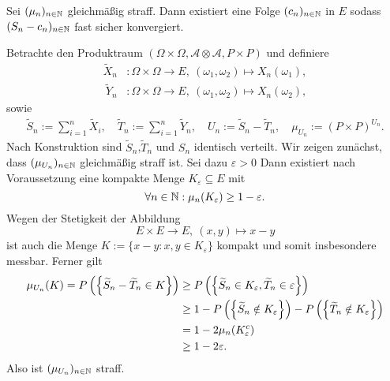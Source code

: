 \begin{theorem}
    Sei $(\mu_n)_{n \in \mathbb{N}}$ gleichmäßig straff. Dann existiert eine Folge $(c_n)_{n \in \mathbb{N}}$ in $E$ sodass $(S_n - c_n)_{n \in \mathbb{N}}$ fast sicher konvergiert.
\end{theorem}

\begin{proof*}
    Betrachte den Produktraum $(\Omega \times \Omega, \mathcal{A} \otimes \mathcal{A}, P \times P)$ und definiere 
    \begin{align*}
        \widetilde{X}_n&: \Omega \times \Omega \to E, \ (\omega_1, \omega_2) \mapsto X_n(\omega_1), \\\
        \widetilde{Y}_n&: \Omega \times \Omega \to E, \ (\omega_1, \omega_2) \mapsto X_n(\omega_2),
    \end{align*}
    sowie 
    \begin{align*}
        \widetilde{S}_n := \sum_{i = 1}^n \widetilde{X}_i, \quad \widetilde{T}_n := \sum_{i = 1}^n \widetilde{Y}_n, \quad U_n := \widetilde{S}_n - \widetilde{T}_n, \quad \mu_{U_n} := (P\times P)^{U_n}. 
    \end{align*}
    Nach Konstruktion sind $\widetilde{S}_n$,$\widetilde{T}_n$ und $S_n$ identisch verteilt. Wir zeigen zunächst, dass $(\mu_{U_n})_{n \in \mathbb{N}}$ gleichmäßig straff ist. 
    Sei dazu $\varepsilon > 0$ Dann existiert nach Voraussetzung eine kompakte Menge $K_{\varepsilon} \subseteq E$ mit 
    $$
        \forall n \in \mathbb{N}: \mu_n(K_{\varepsilon}) \geq 1 - \varepsilon. 
    $$
    Wegen der Stetigkeit der Abbildung 
    $$
        E \times E \to E, \ (x,y) \mapsto x - y
    $$
    ist auch die Menge $K := \{ x - y : x,y \in K_{\varepsilon} \}$ kompakt und somit insbesondere messbar. Ferner gilt
    \begin{align*}
        \mu_{U_n}(K) = P\left(\left\{ \widetilde{S}_n - \widetilde{T}_n \in K \right\}\right) &\geq P\left(\left\{ \widetilde{S}_n \in K_{\varepsilon}, \widetilde{T}_n \in \varepsilon \right\}\right) \\\
                                                              &\geq 1 - P\left(\left\{ \widetilde{S}_n \notin K_{\varepsilon} \right\}\right) - P\left(\left\{ \widetilde{T}_n \notin K_{\varepsilon} \right\}\right) \\\
                                                              &= 1 - 2\mu_n(K_{\varepsilon}^c) \\\
                                                              &\geq 1 - 2 \varepsilon.                                              
    \end{align*}
    Also ist $(\mu_{U_n})_{n \in \mathbb{N}}$ straff. 

\end{proof*}
